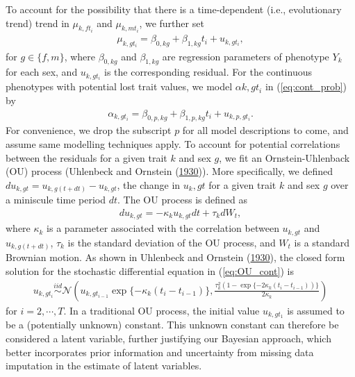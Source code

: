 \documentclass[
  12pt,
]{article}
\begin{document}
To account for the possibility that there is a time-dependent (i.e.,
evolutionary trend) trend in \(\mu_{k,ft_i}\) and \(\mu_{k,mt_i}\), we
further set \begin{align}
\mu_{k,gt_i} = \beta_{0,kg} + \beta_{1,kg}t_i + u_{k,gt_i},
\label{eq:mu}
\end{align} for \(g \in \{f,m\}\), where \(\beta_{0,kg}\) and
\(\beta_{1,kg}\) are regression parameters of phenotype \(Y_k\) for each
sex, and \(u_{k,gt_i}\) is the corresponding residual. For the
continuous phenotypes with potential lost trait values, we model
\(\alpha{k,gt_i}\) in (\ref{eq:cont_prob}) by \begin{align}
\alpha_{k,gt_i} = \beta_{0,p,kg} + \beta_{1,p,kg}t_i + u_{k,p,gt_i}.
\label{eq:prob}
\end{align} For convenience, we drop the subscript \(p\) for all model
descriptions to come, and assume same modelling techniques apply. To
account for potential correlations between the residuals for a given
trait \(k\) and sex \(g\), we fit an Ornstein-Uhlenback (OU) process
(Uhlenbeck and Ornstein (\protect\hyperlink{ref-OUProcess}{1930})). More
specifically, we defined \(du_{k,gt} = u_{k,g(t + dt)} - u_{k,gt}\), the
change in \(u_k,gt\) for a given trait \(k\) and sex \(g\) over a
miniscule time period \(dt\). The OU process is defined as \begin{align}
du_{k,gt} = -\kappa_k u_{k,gt} dt + \tau_k dW_t,
\label{eq:OU_cont}
\end{align} where \(\kappa_k\) is a parameter associated with the
correlation between \(u_{k,gt}\) and \(u_{k,g(t+dt)}\), \(\tau_k\) is
the standard deviation of the OU process, and \(W_t\) is a standard
Brownian motion. As shown in Uhlenbeck and Ornstein
(\protect\hyperlink{ref-OUProcess}{1930}), the closed form solution for
the stochastic differential equation in (\ref{eq:OU_cont}) is
\begin{align}
u_{k,gt_i} \overset{iid}{\sim}\mathcal{N}\left(u_{k,gt_{i-1}}\exp\{-\kappa_k(t_{i} - t_{i-1})\} , \frac{\tau_k^2(1 - \exp\{-2\kappa_k(t_{i} - t_{i-1}))\}}{2\kappa_k}\right)
\label{eq:OU_sol}
\end{align} for \(i = 2,\cdots,T\). In a traditional OU process, the
initial value \(u_{k,gt_1}\) is assumed to be a (potentially unknown)
constant. This unknown constant can therefore be considered a latent
variable, further justifying our Bayesian approach, which better
incorporates prior information and uncertainty from missing data
imputation in the estimate of latent variables.
\end{document}
